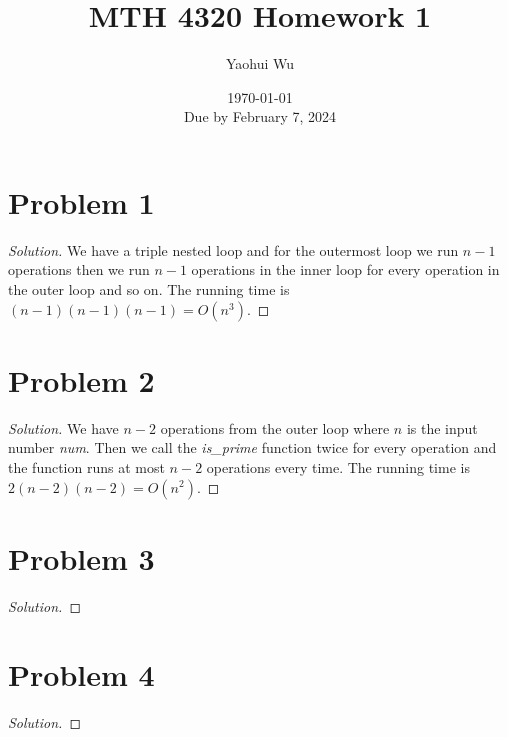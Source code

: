 \documentclass[12pt, letterpaper]{article}
\title{MTH 4320 Homework 1}
\author{Yaohui Wu}
\date{\today \\ Due by February 7, 2024}
\newenvironment{solution}{\begin{proof}[Solution]}{\end{proof}}
\begin{document}
\maketitle
\tableofcontents
\section{Problem 1}
\begin{solution}
    We have a triple nested loop and for the outermost loop we run \(n-1\) operations
    then we run \(n-1\) operations in the inner loop for every operation in the outer loop
    and so on. The running time is \((n-1)(n-1)(n-1)=O(n^3)\).
\end{solution}

\section{Problem 2}
\begin{solution}
    We have \(n-2\) operations from the outer loop where \(n\) is the input number \textit{num}. Then we call the \textit{is\_prime} function twice for every operation
    and the function runs at most \(n-2\) operations every time. The running time is \(2(n-2)(n-2)=O(n^2)\).
\end{solution}

\section{Problem 3}
\begin{solution}
    
\end{solution}

\section{Problem 4}
\begin{solution}
    
\end{solution}
\end{document}
